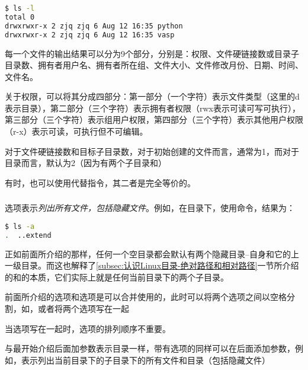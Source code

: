 \begin{lstlisting}[language=bash]
$ ls -l
total 0
drwxrwxr-x 2 zjq zjq 6 Aug 12 16:35 python
drwxrwxr-x 2 zjq zjq 6 Aug 12 16:35 vasp
\end{lstlisting}

\begin{extend}
每一个文件的输出结果可以分为9个部分，分别是：权限、文件硬链接数或目录子目录数、拥有者用户名、拥有者所在组、文件大小、文件修改月份、日期、时间、文件名。

关于权限，可以将其分成四部分：第一部分（一个字符）表示文件类型（这里的d表示目录），第二部分（三个字符）表示拥有者权限（rwx表示可读可写可执行），第三部分（三个字符）表示组用户权限，第四部分（三个字符）表示其他用户权限（r-x）表示可读，可执行但不可编辑。

对于文件硬链接数和目标子目录数，对于初始创建的文件而言，通常为1，而对于目录而言，默认为2（因为有两个子目录和）
\end{extend}

有时，也可以使用代替指令，其二者是完全等价的。

\subsubsection{}

选项表示\emph{列出所有文件，包括隐藏文件}。例如，在目录下，使用命令，结果为：

\begin{lstlisting}[language=bash]
$ ls -a
.  ..extend
\end{lstlisting}

\begin{extend}
    正如前面所介绍的那样，任何一个空目录都会默认有两个隐藏目录--自身和它的上一级目录。而这也解释了\ref{subsec:认识Linux目录-绝对路径和相对路径}一节所介绍的和的本质，它们实际上就是任何当前目录下的两个子目录。
\end{extend}

\begin{attention}
    前面所介绍的选项和选项是可以合并使用的，此时可以将两个选项之间以空格分割，如，或者将两个选项写在一起

    当选项写在一起时，选项的排列顺序不重要。

    与最开始介绍后面加参数表示目录一样，带有选项的同样可以在后面添加参数，例如，表示列出当前目录下的子目录下的所有文件和目录（包括隐藏文件）
\end{attention}

